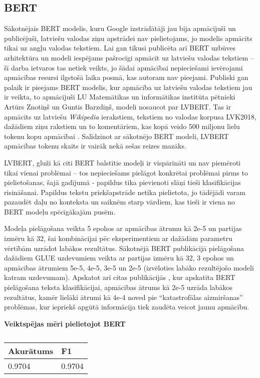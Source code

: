 \pagebreak


\subsection{BERT}
Sākotnējais BERT modelis, kuru Google izstrādātāji jau bija apmācījuši un publicējuši, latviešu valodas ziņu apstrādei nav pielietojams, jo modelis apmācīts tikai uz angļu valodas tekstiem. Lai gan tikusi publicēta arī BERT uzbūves arhitektūra un modeli iespējams pašrocīgi apmācīt uz latviešu valodas tekstiem – šī darba ietvaros tas netiek veikts, jo šādai apmācībai nepieciešami ievērojami apmācības resursi ilgstošā laika posmā, kas autoram nav pieejami. Publiski gan palaik ir pieejams BERT modelis, kur apmācība uz latviešu valodas tekstiem jau ir veikta, to apmācījuši LU Matemātikas un informātikas institūta pētnieki Artūrs Znotiņš un Guntis Barzdiņš, modeli nosaucot par LVBERT. Tas ir apmācīts uz latviešu \textit{Wikipedia} ierakstiem, tekstiem no valodas korpusa LVK2018, dažādiem ziņu rakstiem un to komentāriem, kas kopā veido 500 miljonu lielu tokenu kopu apmācībai \cite{lvbert}. Salīdzinot ar sākotnējo BERT modeli, LVBERT apmācības tokenu skaits ir vairāk nekā sešas reizes mazāks.

LVBERT, gluži kā citi BERT balstītie modeļi ir vispārināti un nav piemēroti tikai vienai problēmai – tos nepieciešams pielāgot konkrētai problēmai pirms to pielietošanas, šajā gadījumā - papildus tika pievienoti slāņi tieši klasifikācijas risināšanai. Papildus tekstu priekšapstrāde netika pielietota, jo tādējādi varam pazaudēt daļu no konteksta un saiknēm starp vārdiem, kas tieši ir viena no BERT modeļu spēcīgākajām pusēm.

Modeļa pielāgošana veikta 5 epohos ar apmācības ātrumu kā 2e-5 un partijas izmēru kā 32, šai kombinācijai pēc eksperimentiem ar dažādām parametru vērtībām uzrādot labākos rezultātus. Sākotnējā BERT publikācijā \cite{devlin2019bert} pielāgošana dažādiem GLUE uzdevumiem veikta ar partijas izmēru kā 32, 3 epohos un apmācības ātrumiem 5e-5, 4e-5, 3e-5 un 2e-5 (izvēloties labāko rezultējošo modeli katram uzdevumam).  Apskatot arī citas publikācijās \cite{sun2020finetune}, kur apskatīta BERT pielāgošana teksta klasifikācijai, apmācības ātrums kā 2e-5 uzrāda labākos rezultātus, kamēr lielāki ātrumi kā 4e-4 noved pie “katastrofālas aizmiršanas” problēmas, kur iepriekš apgūtā informācija tiek zaudēta veicot jaunu apmācību.

\begin{table}[H]
\centering
\caption{\label{tab:score_bert}}
\textbf{Veiktspējas mēri pielietojot BERT\\}
\begin{tabular}{|l|l|}
\hline
Akurātums & F1 \\ \hline
0.9704 & 0.9704  \\ \hline
\end{tabular}
\end{table}


